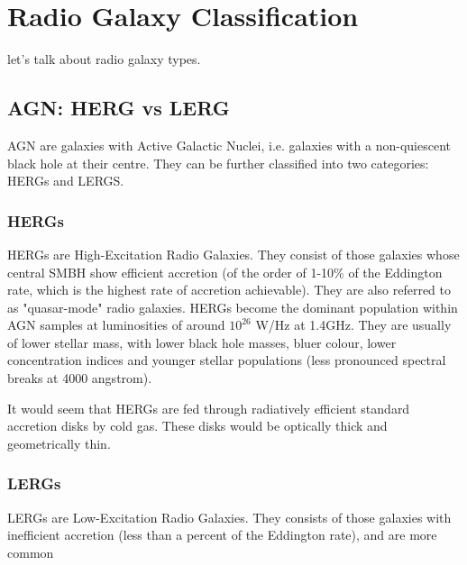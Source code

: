 
\section{Radio Galaxy Classification}\label{section.science}
\pg
let's talk about radio galaxy types.

\subsection{AGN: HERG vs LERG}
\pg
AGN are galaxies with Active Galactic Nuclei, i.e. galaxies with a non-quiescent black hole at their centre. They can be further classified into two categories: HERGs and LERGS.

\subsubsection{HERGs}
\pg
HERGs are High-Excitation Radio Galaxies. They consist of those galaxies whose central SMBH show efficient accretion (of the order of 1-10\% of the Eddington rate, which is the highest rate of accretion achievable). They are also referred to as "quasar-mode" radio galaxies. HERGs become the dominant population within AGN samples at luminosities of around $10^{26}$ W/Hz at 1.4GHz. They are usually of lower stellar mass, with lower black hole masses, bluer colour, lower concentration indices and younger stellar populations (less pronounced spectral breaks at 4000 angstrom).

\pg
It would seem that HERGs are fed through radiatively efficient standard accretion disks by cold gas. These disks would be optically thick and geometrically thin.

\subsubsection{LERGs}

\pg
LERGs are Low-Excitation Radio Galaxies. They consists of those galaxies with inefficient accretion (less than a percent of the Eddington rate), and are more common 